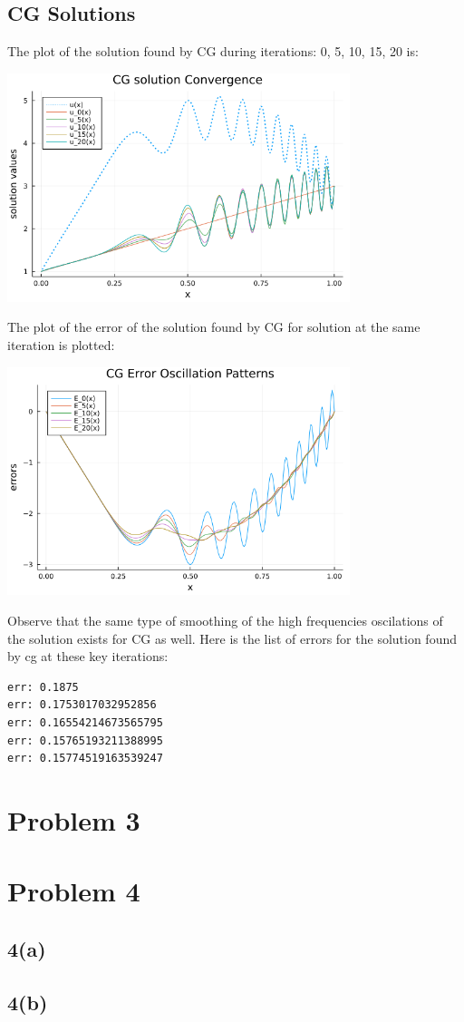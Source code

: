 \documentclass[]{article}
\begin{document}
    \subsection*{CG Solutions}
        The plot of the solution found by CG during iterations: 0, 5, 10, 15, 20 is: 
        \begin{center}
            \includegraphics[width=10cm]{p2_cg_solns.png}
        \end{center}
        The plot of the error of the solution found by CG for solution at the same iteration is plotted: 
        \begin{center}
            \includegraphics[width=10cm]{p2_cg_errors.png}
        \end{center}
        Observe that the same type of smoothing of the high frequencies oscilations of the solution exists for CG as well. Here is the list of errors for the solution found by cg at these key iterations: 
        \begin{verbatim}
err: 0.1875
err: 0.1753017032952856
err: 0.16554214673565795
err: 0.15765193211388995
err: 0.15774519163539247
        \end{verbatim}



\section*{Problem 3}
    
\section*{Problem 4}
    \subsection*{4(a)}
        
    \subsection*{4(b)}
\end{document}
